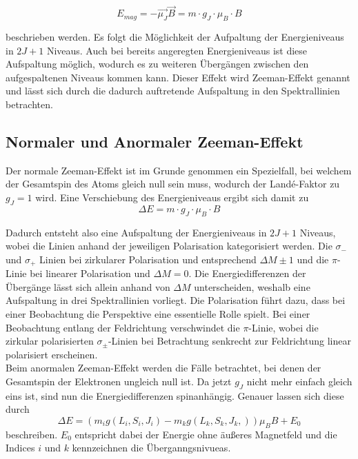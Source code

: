 \begin{equation}
    E_{mag} =  -\vec{\mu_J} \vec{B} = m\cdot g_J\cdot \mu_B\cdot B
\end{equation}

beschrieben werden. Es folgt die Möglichkeit der Aufpaltung der Energieniveaus in $2J+1$ Niveaus.
Auch bei bereits angeregten Energieniveaus ist diese Aufspaltung möglich, wodurch es zu weiteren Übergängen zwischen den aufgespaltenen Niveaus 
kommen kann. Dieser Effekt wird Zeeman-Effekt genannt und lässt sich durch die dadurch auftretende Aufspaltung in den Spektrallinien betrachten.

\subsection{Normaler und Anormaler Zeeman-Effekt}

Der normale Zeeman-Effekt ist im Grunde genommen ein Spezielfall, bei welchem der Gesamtspin des Atoms gleich null sein muss, wodurch der 
Landé-Faktor zu $g_J = 1$ wird. Eine Verschiebung des Energieniveaus ergibt sich damit zu 
\begin{equation}
    \Delta E = m\cdot g_J\cdot \mu_B\cdot B
\end{equation}

Dadurch entsteht also eine Aufspaltung der Energieniveaus in $2J+1$ Niveaus, wobei die Linien anhand der jeweiligen Polarisation kategorisiert
werden. Die $\sigma_-$ und $\sigma_+$ Linien bei zirkularer Polarisation und entsprechend $\Delta M \pm 1$ und die $\pi$-Linie bei linearer 
Polarisation und $\Delta M =0$. Die Energiedifferenzen der Übergänge lässt sich allein anhand von $\Delta M$ unterscheiden, weshalb eine 
Aufspaltung in drei Spektrallinien vorliegt. Die Polarisation führt dazu, dass bei einer Beobachtung die Perspektive eine essentielle Rolle spielt.
Bei einer Beobachtung entlang der Feldrichtung verschwindet die $\pi$-Linie, wobei die zirkular polarisierten $\sigma_{\pm}$-Linien bei 
Betrachtung senkrecht zur Feldrichtung linear polarisiert erscheinen. 
\\
Beim anormalen Zeeman-Effekt werden die Fälle betrachtet, bei denen der Gesamtspin der Elektronen ungleich null ist. Da jetzt $g_J$ nicht mehr 
einfach gleich eins ist, sind nun die Energiedifferenzen spinanhängig. Genauer lassen sich diese durch 
\begin{equation}
    \Delta E = (m_i g(L_i,S_i,J_i) -m_k g(L_k,S_k,J_k,))\mu_B B + E_0
\end{equation}
beschreiben. $E_0$ entspricht dabei der Energie ohne äußeres Magnetfeld und die Indices $i$ und $k$ kennzeichnen die Überganngsnivueas. 

